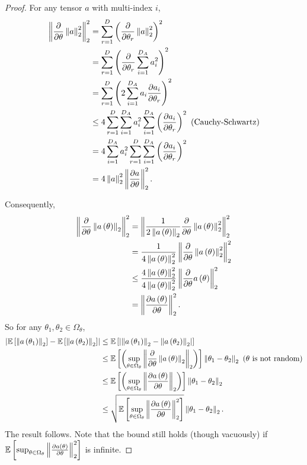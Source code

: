 \begin{proof}
For any tensor $a$ with multi-index $i$,
\begin{align*}
\left\Vert \frac{\partial}{\partial\theta}\left\Vert a\right\Vert_{2}^{2}\right\Vert_{2}^{2} & =\sum_{r=1}^{D}\left(\frac{\partial}{\partial\theta_{r}}\left\Vert a\right\Vert_{2}^{2}\right)^{2}\\
 & =\sum_{r=1}^{D}\left(\frac{\partial}{\partial\theta_{r}}\sum_{i=1}^{D_{A}}a_{i}^{2}\right)^{2}\\
 & =\sum_{r=1}^{D}\left(2\sum_{i=1}^{D_{A}}a_{i}\frac{\partial a_{i}}{\partial\theta_{r}}\right)^{2}\\
 & \le4\sum_{r=1}^{D}\sum_{i=1}^{D_{A}}a_{i}^{2}\sum_{i=1}^{D_{A}}\left(\frac{\partial a_{i}}{\partial\theta_{r}}\right)^{2}\textrm{ (Cauchy-Schwartz)}\\
 & =4\sum_{i=1}^{D_{A}}a_{i}^{2}\sum_{r=1}^{D}\sum_{i=1}^{D_{A}}\left(\frac{\partial a_{i}}{\partial\theta_{r}}\right)^{2}\\
 & =4\left\Vert a\right\Vert_{2}^{2}\left\Vert \frac{\partial a}{\partial\theta}\right\Vert_{2}^{2}.
\end{align*}

Consequently,
\begin{align*}
\left\Vert \frac{\partial}{\partial\theta}\left\Vert a\left(\theta\right)\right\Vert_{2}\right\Vert_{2}^{2} & =\left\Vert \frac{1}{2\left\Vert a\left(\theta\right)\right\Vert_{2}}\frac{\partial}{\partial\theta}\left\Vert a\left(\theta\right)\right\Vert_{2}^{2}\right\Vert_{2}^{2}\\
 & =\frac{1}{4\left\Vert a\left(\theta\right)\right\Vert_{2}^{2}}\left\Vert \frac{\partial}{\partial\theta}\left\Vert a\left(\theta\right)\right\Vert_{2}^{2}\right\Vert_{2}^{2}\\
 & \le\frac{4\left\Vert a\left(\theta\right)\right\Vert_{2}^{2}}{4\left\Vert a\left(\theta\right)\right\Vert_{2}^{2}}\left\Vert \frac{\partial}{\partial\theta}a\left(\theta\right)\right\Vert_{2}^{2}\\
 & =\left\Vert \frac{\partial a\left(\theta\right)}{\partial\theta}\right\Vert_{2}^{2}.
\end{align*}
So for any $\theta_{1},\theta_{2}\in\Omega_{\theta}$,
\begin{align*}
\left|\mathbb{E}\left[\left\Vert a\left(\theta_{1}\right)\right\Vert_{2}\right]-\mathbb{E}\left[\left\Vert a\left(\theta_{2}\right)\right\Vert_{2}\right]\right| & \le\mathbb{E}\left[\left|\left\Vert a\left(\theta_{1}\right)\right\Vert_{2}-\left\Vert a\left(\theta_{2}\right)\right\Vert_{2}\right|\right]\\
 & \le\mathbb{E}\left[\left(\sup_{\theta\in\Omega_{\theta}}\left\Vert \frac{\partial}{\partial\theta}\left\Vert a\left(\theta\right)\right\Vert_{2}\right\Vert_{2}\right)\right]\left\Vert \theta_{1}-\theta_{2}\right\Vert_{2}\textrm{ (}\theta\textrm{ is not random)}\\
 & \le\mathbb{E}\left[\left(\sup_{\theta\in\Omega_{\theta}}\left\Vert \frac{\partial a\left(\theta\right)}{\partial\theta}\right\Vert_{2}\right)\right]\left\Vert \theta_{1}-\theta_{2}\right\Vert_{2}\\
 & \le\sqrt{\mathbb{E}\left[\sup_{\theta\in\Omega_{\theta}}\left\Vert \frac{\partial a\left(\theta\right)}{\partial\theta}\right\Vert_{2}^{2}\right]}\left\Vert \theta_{1}-\theta_{2}\right\Vert_{2}.
\end{align*}
The result follows. Note that the bound still holds (though vacuously)
if $\mathbb{E}\left[\sup_{\theta\in\Omega_{\theta}}\left\Vert \frac{\partial a\left(\theta\right)}{\partial\theta}\right\Vert_{2}^{2}\right]$
is infinite.
\end{proof}
